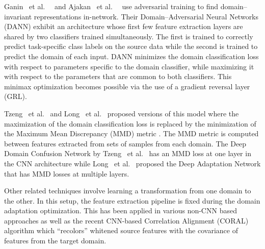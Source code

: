 \documentclass{article}
\newcommand{\etal}{~et al.~}
\begin{document}
Ganin \etal ~\cite{ganin2014unsupervised,ganin2016domain} and Ajakan
\etal ~\cite{Ajakan2014} use adversarial training to find
domain--invariant representations
in-network. Their Domain--Adversarial Neural Networks (DANN) exhibit an 
architecture whose first few feature extraction layers are shared by two
classifiers trained simultaneously. The first is trained to correctly
predict task-specific class labels on the source data  while the second is
trained to predict the domain of each input. DANN minimizes the domain
classification loss with respect to parameters specific to the domain
classifier, while maximizing it with respect to the parameters that are
common to both classifiers. This minimax optimization becomes possible via
the use of a  gradient reversal layer (GRL). 





Tzeng \etal \cite{tzeng2015ddc} and Long \etal
\cite{long2015learning} proposed versions of this model where
the maximization of the domain classification loss is replaced by the minimization
of the Maximum Mean Discrepancy (MMD) metric \cite{gretton2012mmd}. The MMD
metric is computed between features extracted from sets of samples from each
domain. The Deep Domain Confusion Network by Tzeng \etal \cite{tzeng2015ddc} has an 
MMD loss at one layer in the CNN architecture while Long \etal
\cite{long2015learning} proposed the Deep Adaptation Network that has MMD losses at
multiple layers. 



Other related techniques involve learning a transformation from one domain to the other. In this setup, the feature extraction pipeline is fixed during the domain adaptation optimization. 
This has been applied in various non-CNN based approaches
\cite{gong2012geodesic,caseiro2015beyond,gopalan2011domain} as well as the recent
CNN-based Correlation Alignment (CORAL) \cite{sun2015return} algorithm which
``recolors'' whitened source features with the covariance of features from the
target domain. 









%
 
\end{document}
